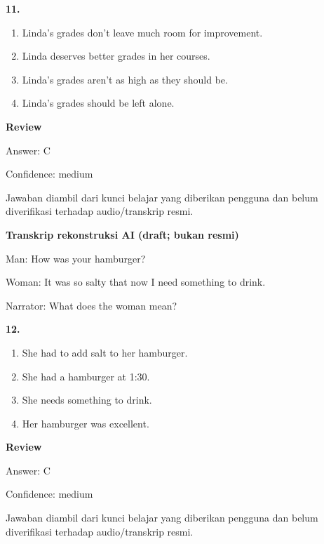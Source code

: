\documentclass[12pt]{article}
\begin{document}
\noindent\textbf{11.}
\begin{enumerate}[label=(\Alph*),leftmargin=*,itemsep=0.2em]
\item Linda's grades don't leave much room for improvement.
\item Linda deserves better grades in her courses.
\item Linda's grades aren't as high as they should be.
\item Linda's grades should be left alone.
\end{enumerate}
\par
\begingroup
\setlength{\parskip}{0pt}
\setlength{\parindent}{0pt}
\textbf{Review}\par
Answer: C\par
Confidence: medium\par
Jawaban diambil dari kunci belajar yang diberikan pengguna dan belum diverifikasi terhadap audio/transkrip resmi.\par
\endgroup
\par
\vspace{0.25\baselineskip}
\begin{exampleblock}
\textbf{Transkrip rekonstruksi AI (draft; bukan resmi)}\par
Man: How was your hamburger?\par
Woman: It was so salty that now I need something to drink.\par
Narrator: What does the woman mean?\par
\end{exampleblock}
\noindent\textbf{12.}
\begin{enumerate}[label=(\Alph*),leftmargin=*,itemsep=0.2em]
\item She had to add salt to her hamburger.
\item She had a hamburger at 1:30.
\item She needs something to drink.
\item Her hamburger was excellent.
\end{enumerate}
\par
\begingroup
\setlength{\parskip}{0pt}
\setlength{\parindent}{0pt}
\textbf{Review}\par
Answer: C\par
Confidence: medium\par
Jawaban diambil dari kunci belajar yang diberikan pengguna dan belum diverifikasi terhadap audio/transkrip resmi.\par
\endgroup
\par
\vspace{0.25\baselineskip}
\end{document}

